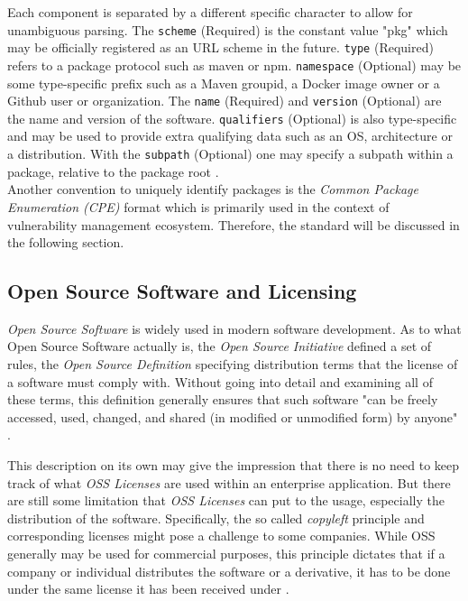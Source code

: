 Each component is separated by a different specific character to allow for unambiguous parsing. The \lstinline|scheme| (Required) is the constant value "pkg" which may be officially registered as an URL scheme in the future. \lstinline|type| (Required) refers to a package protocol such as maven or npm. \lstinline|namespace| (Optional) may be some type-specific prefix such as a Maven groupid, a Docker image owner or a Github user or organization. The \lstinline|name| (Required) and \lstinline|version| (Optional) are the name and version of the software. \lstinline|qualifiers| (Optional) is also type-specific and may be used to provide extra qualifying data such as an OS, architecture or a distribution. With the \lstinline|subpath| (Optional) one may specify a subpath within a package, relative to the package root \cite{purl}.\\

Another convention to uniquely identify packages is the \textit{Common Package Enumeration (CPE)} format which is primarily used in the context of vulnerability management ecosystem. Therefore, the standard will be discussed in the following section.

\subsection{Open Source Software and Licensing}
\textit{Open Source Software} is widely used in modern software development. As to what Open Source Software actually is, the \textit{Open Source Initiative} defined a set of rules, the \textit{Open Source Definition} specifying distribution terms that the license of a software must comply with. Without going into detail and examining all of these terms, this definition generally ensures that such software "can be freely accessed, used, changed, and shared (in modified or unmodified form) by anyone" \cite{OSI}.\par
This description on its own may give the impression that there is no need to keep track of what \textit{OSS Licenses} are used within an enterprise application. But there are still some limitation that \textit{OSS Licenses} can put to the usage, especially the distribution of the software. Specifically, the so called \textit{copyleft} principle and corresponding licenses might pose a challenge to some companies. While OSS generally may be used for commercial purposes, this principle dictates that if a company or individual distributes the software or a derivative, it has to be done under the same license it has been received under \cite{OSI}.\\

